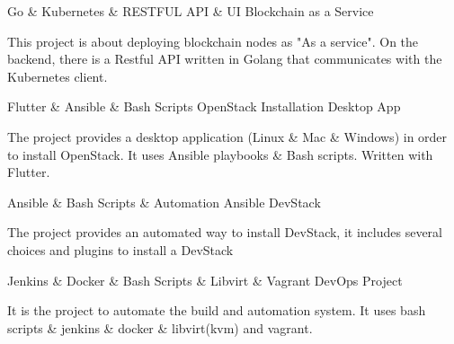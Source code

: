 

\begin{cventries}

  \cventry
    {Go \& Kubernetes \& RESTFUL API \& UI} %
    {Blockchain as a Service} %
    { } %
    { } %
    {
      \begin{cvitems} %
        \item {This project is about deploying blockchain nodes as "As a service". On the backend, there is a Restful API written in Golang that communicates with the Kubernetes client.}
      \end{cvitems}
    }

  \cventry
    {Flutter \& Ansible \& Bash Scripts} %
    {OpenStack Installation Desktop App} %
    { } %
    { } %
    {
      \begin{cvitems} %
        \item {The project provides a desktop application (Linux \& Mac \& Windows) in order to install OpenStack. It uses Ansible playbooks \& Bash scripts. Written with Flutter.}
      \end{cvitems}
    }

  \cventry
    {Ansible \& Bash Scripts \& Automation} %
    {Ansible DevStack} %
    { } %
    { } %
    {
      \begin{cvitems} %
        \item {The project provides an automated way to install DevStack, it includes several choices and plugins to install a DevStack}
      \end{cvitems}
    }

  \cventry
    {Jenkins \& Docker \& Bash Scripts \& Libvirt \& Vagrant} %
    {DevOps Project} %
    { } %
    { } %
    {
      \begin{cvitems} %
        \item {It is the project to automate the build and
        automation system. It uses bash scripts \& jenkins \& docker \&
        libvirt(kvm) and vagrant.}
      \end{cvitems}
    }


\end{cventries}
